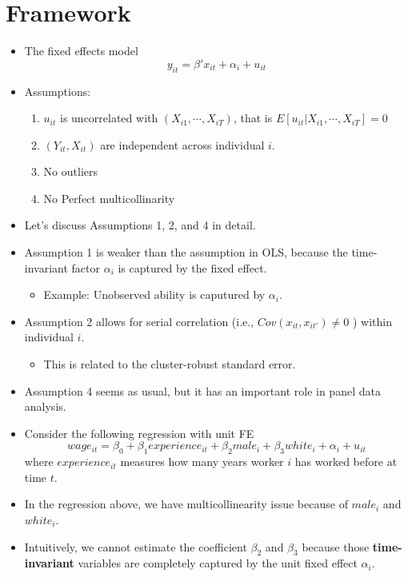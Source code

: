 \documentclass[]{book}
\providecommand{\tightlist}{%
  \setlength{\itemsep}{0pt}\setlength{\parskip}{0pt}}
\begin{document}
\section{Framework}\label{framework}

\begin{itemize}
\tightlist
\item
  The fixed effects model \[
  y_{it} = \beta' x_{it} + \alpha_i + u_{it}
  \]
\item
  Assumptions:

  \begin{enumerate}
  \def\labelenumi{\arabic{enumi}.}
  \tightlist
  \item
    \(u_{it}\) is uncorrelated with \((X_{i1},\cdots, X_{iT})\), that is
    \(E[u_{it}|X_{i1},\cdots, X_{iT} ] = 0\)
  \item
    \((Y_{it}, X_{it})\) are independent across individual \(i\).
  \item
    No outliers
  \item
    No Perfect multicollinarity
  \end{enumerate}
\item
  Let's discuss Assumptions 1, 2, and 4 in detail.
\item
  Assumption 1 is weaker than the assumption in OLS, because the
  time-invariant factor \(\alpha_i\) is captured by the fixed effect.

  \begin{itemize}
  \tightlist
  \item
    Example: Unobserved ability is caputured by \(\alpha_i\).
  \end{itemize}
\item
  Assumption 2 allows for serial correlation (i.e.,
  \(Cov(x_{it},x_{it'} ) \neq 0\) ) within individual \(i\).

  \begin{itemize}
  \tightlist
  \item
    This is related to the cluster-robust standard error.
  \end{itemize}
\item
  Assumption 4 seems as usual, but it has an important role in panel
  data analysis.
\item
  Consider the following regression with unit FE \[
  wage_{it} = \beta_0 + \beta_1 experience_{it} + \beta_2 male_{i} + \beta_3 white_{i} + \alpha_i + u_{it}
  \] where \(experience_{it}\) measures how many years worker \(i\) has
  worked before at time \(t\).
\item
  In the regression above, we have multicollinearity issue because of
  \(male_{i}\) and \(white_{i}\).
\item
  Intuitively, we cannot estimate the coefficient \(\beta_2\) and
  \(\beta_3\) because those \textbf{time-invariant} variables are
  completely captured by the unit fixed effect \(\alpha_i\).
\end{itemize}
\end{document}

